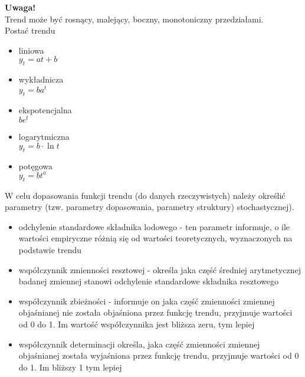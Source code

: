 \textbf{Uwaga!}\\
Trend może być rosnący, malejący, boczny, monotoniczny przedziałami.\\
Postać trendu
\begin{itemize}
\item liniowa\\
$ y_t=at+b $
\item wykładnicza\\
$ y_t=ba^t $
\item ekspotencjalna\\
$ be^t $
\item logarytmiczna\\
$ y_t=b\cdot \ln t $
\item potęgowa\\
$ y_t=bt^a $
\end{itemize}
W celu dopasowania funkcji trendu (do danych rzeczywistych) należy określić parametry (tzw. parametry dopasowania, parametry struktury) stochastycznej).
\begin{itemize}
\item odchylenie standardowe składnika lodowego - ten parametr informuje, o ile wartości empiryczne różnią się od wartości teoretycznych, wyznaczonych na podstawie trendu
\item współczynnik zmienności resztowej - określa jaka część średniej arytmetycznej badanej zmiennej stanowi odchylenie standardowe składnika resztowego
\item współczynnik zbieżności - informuje on jaka część zmienności zmiennej objaśnianej nie została objaśniona przez funkcję trendu, przyjmuje wartości od 0 do 1. Im wartość współczynnika jest bliższa zeru, tym lepiej
\item współczynnik determinacji określa, jaka część zmienności zmiennej objaśnianej została wyjaśniona przez funkcję trendu, przyjmuje wartości od 0 do 1. Im bliższy 1 tym lepiej
\end{itemize}
